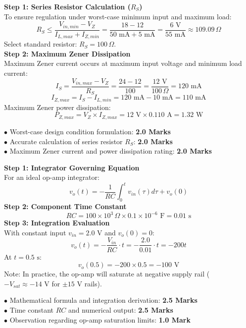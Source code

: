 \begin{solutionbox}
\textbf{Step 1: Series Resistor Calculation ($R_S$)}\\
To ensure regulation under worst-case minimum input and maximum load:
\[ R_S \le \frac{V_{in,min} - V_Z}{I_{L,max} + I_{Z,min}} = \frac{18 - 12}{50\text{ mA} + 5\text{ mA}} = \frac{6\text{ V}}{55\text{ mA}} \approx 109.09\,\Omega \]
Select standard resistor: $R_S = 100\,\Omega$.\\
\textbf{Step 2: Maximum Zener Dissipation}\\
Maximum Zener current occurs at maximum input voltage and minimum load current:
\[ I_S = \frac{V_{in,max} - V_Z}{R_S} = \frac{24 - 12}{100} = \frac{12\text{ V}}{100\,\Omega} = 120\text{ mA} \]
\[ I_{Z,max} = I_S - I_{L,min} = 120\text{ mA} - 10\text{ mA} = 110\text{ mA} \]
Maximum Zener power dissipation:
\[ P_{Z,max} = V_Z \times I_{Z,max} = 12\text{ V} \times 0.110\text{ A} = 1.32\text{ W} \]
\begin{markingrubric}
$\bullet$ Worst-case design condition formulation: \textbf{2.0 Marks}\\
$\bullet$ Accurate calculation of series resistor $R_S$: \textbf{2.0 Marks}\\
$\bullet$ Maximum Zener current and power dissipation rating: \textbf{2.0 Marks}
\end{markingrubric}
\end{solutionbox}

\begin{solutionbox}
\textbf{Step 1: Integrator Governing Equation}\\
For an ideal op-amp integrator:
\[ v_o(t) = -\frac{1}{RC}\int_0^t v_{in}(\tau) d\tau + v_o(0) \]
\textbf{Step 2: Component Time Constant}\\
\[ RC = 100 \times 10^3\,\Omega \times 0.1 \times 10^{-6}\text{ F} = 0.01\text{ s} \]
\textbf{Step 3: Integration Evaluation}\\
With constant input $v_{in} = 2.0\text{ V}$ and $v_o(0) = 0$:
\[ v_o(t) = -\frac{V_{in}}{RC} \cdot t = -\frac{2.0}{0.01} \cdot t = -200 t \]
At $t = 0.5\text{ s}$:
\[ v_o(0.5) = -200 \times 0.5 = -100\text{ V} \]
Note: In practice, the op-amp will saturate at negative supply rail ($-V_{sat} \approx -14\text{ V}$ for $\pm 15\text{ V}$ rails).
\begin{markingrubric}
$\bullet$ Mathematical formula and integration derivation: \textbf{2.5 Marks}\\
$\bullet$ Time constant $RC$ and numerical output: \textbf{2.5 Marks}\\
$\bullet$ Observation regarding op-amp saturation limits: \textbf{1.0 Mark}
\end{markingrubric}
\end{solutionbox}
\newpage
